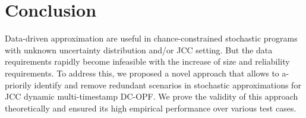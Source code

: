 \vspace{-1mm}
\section{Conclusion}\label{sec:conclusion}
\vspace{-1mm}
Data-driven approximation are useful in chance-constrained stochastic programs with unknown uncertainty distribution and/or JCC setting. But the data requirements rapidly become infeasible with the increase of size and reliability requirements. To address this, we proposed a novel approach that allows to a-priorily identify and remove redundant scenarios in stochastic approximations for JCC dynamic multi-timestamp DC-OPF. We prove the validity of this approach theoretically and 
ensured its high empirical performance over various test cases. 